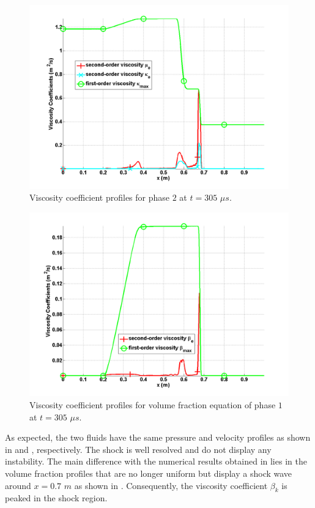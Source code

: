 \begin{figure}[H]
\centering
\includegraphics[width=\textwidth]{figures/SEM/relaxation_two_phases_vapor_viscosity_kappa_mu.png}
\caption{Viscosity coefficient profiles for phase $2$ at $t=305$ $\mu s$.}
\label{fig:two-fluids-rel-visc-1-7-eqn-sect4}
\end{figure}
%
\begin{figure}[H]
\centering
\includegraphics[width=\textwidth]{figures/SEM/relaxation_two_phases_liquid_beta.png}
\caption{Viscosity coefficient profiles for volume fraction equation of phase $1$ at $t=305$ $\mu s$.}
\label{fig:two-fluids-rel-vf-visc-1-7-eqn-sect4}
\end{figure}
%
As expected, the two fluids have the same pressure and velocity profiles as shown in  and , respectively. The shock is well resolved and do not display any instability. The main difference with the numerical results obtained in  lies in the volume fraction profiles that are no longer uniform but display a shock wave around $x=0.7$ $m$ as shown in . Consequently, the viscosity coefficient $\beta_k$ is peaked in the shock region.  
